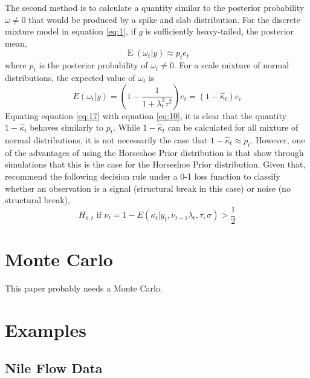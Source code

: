 \documentclass{article}
\DeclareMathOperator{\E}{E}
\begin{document}
The second method is to calculate a quantity similar to the posterior probability $\omega \neq 0$ that would be produced by a spike and slab distribution.
For the discrete mixture model in equation \eqref{eq:1}, if $g$ is sufficiently heavy-tailed, the posterior mean,
\begin{equation}
  \label{eq:17}
  \E(\omega_{t} | y) \approx p_{t} e_{t} 
\end{equation}
where $p_{t}$ is the posterior probability of $\omega_{t} \neq 0$.
For a scale mixture of normal distributions, the expected value of $\omega_{t}$ is 
\begin{equation}
  \label{eq:10}
  E(\omega_{t} | y) =
  \left(
    1 - \frac{1}{1 + \lambda^{2}_{t} \tau^{2}}
  \right) e_{t} = (1 - \hat \kappa_{t}) e_{i}
\end{equation}
Equating equation \eqref{eq:17} with equation \eqref{eq:10}, it is clear that 
the quantity $1 - \hat \kappa_{t}$ behaves similarly to $p_{t}$.
While $1 - \hat \kappa_{t}$ can be calculated for all mixture of normal distributions, it is not necessarily the case that $1 - \hat \kappa_{t} \approx p_{t}$.
However, one of the advantages of using the Horseshoe Prior distribution is that 
\parencite[474]{CarvalhoPolsonScott2010} show through simulations that this is the case for the Horseshoe Prior distribution.
Given that, \textcite{CarvalhoPolsonScott2010} recommend the following  decision rule under a 0-1 loss function to classify whether an observation is a signal (structural break in this case) or noise (no structural break), 
\begin{equation}
  \label{eq:5}
  \text{$H_{0,t}$ if $\nu_{t} = 1 - E(\kappa_{t}|y_{t}, \nu_{t-1} \lambda_{t}, \tau, \sigma) > \frac{1}{2}$}
\end{equation}

\section{Monte Carlo}
\label{sec:monte-carlo}

This paper probably needs a Monte Carlo.

\section{Examples}
\label{sec:examples}

\subsection{Nile Flow Data}
\label{sec:nile}
\end{document}
